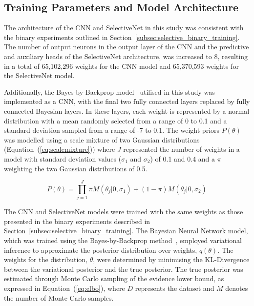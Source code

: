 \subsection{Training Parameters and Model Architecture}
The architecture of the CNN and SelectiveNet in this study was consistent with the binary experiments outlined in Section~\ref{subsec:selective_binary_training}. The number of output neurons in the output layer of the CNN and the predictive and auxiliary heads of the SelectiveNet architecture, was increased to 8, resulting in a total of 65,102,296 weights for the CNN model and 65,370,593 weights for the SelectiveNet model.

Additionally, the Bayes-by-Backprop model~\citep{blundell2015weight} utilised in this study was implemented as a CNN, with the final two fully connected layers replaced by fully connected Bayesian layers. In these layers, each weight is represented by a normal distribution with a mean randomly selected from a range of 0 to 0.1 and a standard deviation sampled from a range of -7 to 0.1. The weight priors $P(\theta)$ was modelled using a scale mixture of two Gaussian distributions (Equation~(\ref{eq:scalemixture})) where $J$ represented the number of weights in a model with standard deviation values ($\sigma_1$ and $\sigma_2$) of 0.1 and 0.4 and a $\pi$ weighting the two Gaussian distributions of 0.5. 

\begin{equation}
	P(\theta) = \prod^J_{j=1}\pi M(\theta_j|0,\sigma_1)+(1-\pi)M(\theta_j|0,\sigma_2)
	\label{eq:scalemixture}
\end{equation}

The CNN and SelectiveNet models were trained with the same weights as those presented in the binary experiments described in Section~\ref{subsec:selective_binary_training}. The Bayesian Neural Network model, which was trained using the Bayes-by-Backprop method~\citep{blundell2015weight}, employed variational inference to approximate the posterior distribution over weights, $q(\theta)$. The weights for the distribution, $\theta$, were determined by minimising the KL-Divergence between the variational posterior and the true posterior. The true posterior was estimated through Monte Carlo sampling of the evidence lower bound, as expressed in Equation~(\ref{eq:elbo}), where $D$ represents the dataset and $M$ denotes the number of Monte Carlo samples.

